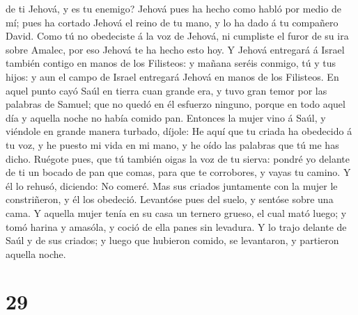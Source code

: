 de ti Jehová, y es tu enemigo?  Jehová pues ha hecho como
habló por medio de mí; pues ha cortado Jehová el reino de tu mano, y lo
ha dado á tu compañero David.  Como tú no obedeciste á la
voz de Jehová, ni cumpliste el furor de su ira sobre Amalec, por eso
Jehová te ha hecho esto hoy.  Y Jehová entregará á Israel
también contigo en manos de los Filisteos: y mañana seréis conmigo, tú y
tus hijos: y aun el campo de Israel entregará Jehová en manos de los
Filisteos.  En aquel punto cayó Saúl en tierra cuan
grande era, y tuvo gran temor por las palabras de Samuel; que no quedó
en él esfuerzo ninguno, porque en todo aquel día y aquella noche no
había comido pan.  Entonces la mujer vino á Saúl, y
viéndole en grande manera turbado, díjole: He aquí que tu criada ha
obedecido á tu voz, y he puesto mi vida en mi mano, y he oído las
palabras que tú me has dicho.  Ruégote pues, que tú
también oigas la voz de tu sierva: pondré yo delante de ti un bocado de
pan que comas, para que te corrobores, y vayas tu camino.
 Y él lo rehusó, diciendo: No comeré. Mas sus criados
juntamente con la mujer le constriñeron, y él los obedeció. Levantóse
pues del suelo, y sentóse sobre una cama.  Y aquella
mujer tenía en su casa un ternero grueso, el cual mató luego; y tomó
harina y amasóla, y coció de ella panes sin levadura.  Y
lo trajo delante de Saúl y de sus criados; y luego que hubieron comido,
se levantaron, y partieron aquella noche.

\hypertarget{section-28}{%
\section{29}\label{section-28}}

